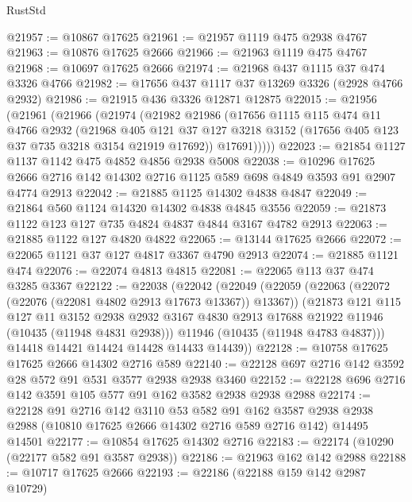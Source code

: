 \begin{lexlean}{RustStd}
\begin{coremodule}
{\begin{coremodule}
{{{{{{{{{{{{{{{{{{{{{{{{{{{{{{{{{{{{{{{{{{{{{{{{{{{{{{{{{{{{{{{{{{{{{{{{{{{{{{@21957 := @10867 @17625
@21961 := @21957 @1119 @475 @2938 @4767
@21963 := @10876 @17625 @2666
@21966 := @21963 @1119 @475 @4767
@21968 := @10697 @17625 @2666
@21974 := @21968 @437 @1115 @37 @474 @3326 @4766
@21982 := @17656 @437 @1117 @37 @13269 @3326 (@2928 @4766 @2932)
@21986 := @21915 @436 @3326 @12871 @12875
@22015 := @21956
    (@21961
      (@21966
        (@21974
          (@21982
            @21986
            (@17656
              @1115
              @115
              @474
              @11
              @4766
              @2932
              (@21968
                @405
                @121
                @37
                @127
                @3218
                @3152
                (@17656 @405 @123 @37 @735 @3218 @3154 @21919 @17692))
              @17691)))))
@22023 := @21854 @1127 @1137 @1142 @475 @4852 @4856 @2938 @5008
@22038 := @10296
    @17625
    @2666
    @2716
    @142
    @14302
    @2716
    @1125
    @589
    @698
    @4849
    @3593
    @91
    @2907
    @4774
    @2913
@22042 := @21885 @1125 @14302 @4838 @4847
@22049 := @21864 @560 @1124 @14320 @14302 @4838 @4845 @3556
@22059 := @21873 @1122 @123 @127 @735 @4824 @4837 @4844 @3167 @4782 @2913
@22063 := @21885 @1122 @127 @4820 @4822
@22065 := @13144 @17625 @2666
@22072 := @22065 @1121 @37 @127 @4817 @3367 @4790 @2913
@22074 := @21885 @1121 @474
@22076 := @22074 @4813 @4815
@22081 := @22065 @113 @37 @474 @3285 @3367
@22122 := @22038
    (@22042
      (@22049
        (@22059
          (@22063 (@22072 (@22076 (@22081 @4802 @2913 @17673 @13367)) @13367))
          (@21873
            @121
            @115
            @127
            @11
            @3152
            @2938
            @2932
            @3167
            @4830
            @2913
            @17688
            @21922
            @11946
            (@10435 (@11948 @4831 @2938)))
          @11946
          (@10435 (@11948 @4783 @4837)))
        @14418
        @14421
        @14424
        @14428
        @14433
        @14439))
@22128 := @10758 @17625 @17625 @2666 @14302 @2716 @589
@22140 := @22128 @697 @2716 @142 @3592 @28 @572 @91 @531 @3577 @2938 @2938 @3460
@22152 := @22128 @696 @2716 @142 @3591 @105 @577 @91 @162 @3582 @2938 @2938 @2988
@22174 := @22128
    @91
    @2716
    @142
    @3110
    @53
    @582
    @91
    @162
    @3587
    @2938
    @2938
    @2988
    (@10810 @17625 @2666 @14302 @2716 @589 @2716 @142)
    @14495
    @14501
@22177 := @10854 @17625 @14302 @2716
@22183 := @22174 (@10290 (@22177 @582 @91 @3587 @2938))
@22186 := @21963 @162 @142 @2988
@22188 := @10717 @17625 @2666
@22193 := @22186 (@22188 @159 @142 @2987 @10729)
}}}}}}}}}}}}}}}}}}}}}}}}}}}}}}}}}}}}}}}}}}}}}}}}}}}}}}}}}}}}}}}}}}}}}}}}}}}}}}
\end{coremodule}}
\end{coremodule}
\end{lexlean}
